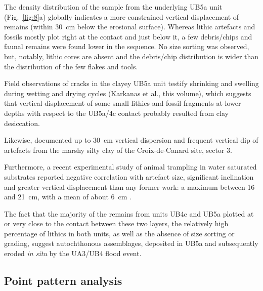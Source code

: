 \documentclass[review,authoryear,times]{elsarticle} %
\begin{document}
The density distribution of the sample from the underlying UB5a unit (Fig.~\ref{fig:8}a) globally indicates a more constrained vertical displacement of remains (within 30~cm below the erosional surface). Whereas lithic artefacts and fossils mostly plot right at the contact and just below it, a few debris/chips and faunal remains were found lower in the sequence. No size sorting was observed, but, notably, lithic cores are absent and the debris/chip distribution is wider than the distribution of the few flakes and tools.

Field observations of cracks in the clayey UB5a unit testify shrinking and swelling during wetting and drying cycles (Karkanas et al., this volume), which suggests that vertical displacement of some small lithics and fossil fragments at lower depths with respect to the UB5a/4c contact probably resulted from clay desiccation.

Likewise, \cite{Lenoble2004} documented up to 30~cm vertical dispersion and frequent vertical dip of artefacts from the marshy silty clay of the Croix-de-Canard site, sector 3.

Furthermore, a recent experimental study of animal trampling in water saturated substrates reported negative correlation with artefact size, significant inclination and greater vertical displacement than any former work: a maximum between 16 and 21~cm, with a mean of about 6~cm \citep{Eren2010}.

The fact that the majority of the remains from units UB4c and UB5a plotted at or very close to the contact between these two layers, the relatively high percentage of lithics in both units, as well as the absence of size sorting or grading, suggest autochthonous assemblages, deposited in UB5a and subsequently eroded \emph{in situ} by the UA3/UB4 flood event.

\subsection{Point pattern analysis}

\end{document}
